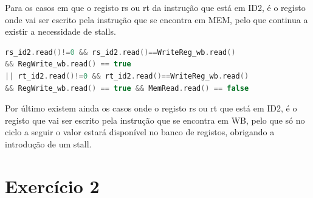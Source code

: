 \documentclass[pdftex,12pt,a4paper]{report}
\begin{document}
Para os casos em que o registo rs ou rt da instrução que está em ID2, é o registo onde vai ser escrito pela instrução que se encontra em MEM, pelo que continua a existir a necessidade de stalls.

\begin{lstlisting}[language=c]
rs_id2.read()!=0 && rs_id2.read()==WriteReg_wb.read() 
&& RegWrite_wb.read() == true
|| rt_id2.read()!=0 && rt_id2.read()==WriteReg_wb.read() 
&& RegWrite_wb.read() == true && MemRead.read() == false
\end{lstlisting} 

\begin{table}[!htb]
\centering
\label{my-label}
\end{table}

Por último existem ainda os casos onde o registo rs ou rt que está em ID2, é o registo que vai ser escrito pela instrução que se encontra em WB, pelo que só no ciclo a seguir o valor estará disponível no banco de registos, obrigando a introdução de um stall.
\newpage
\section{Exercício 2}
\end{document}
